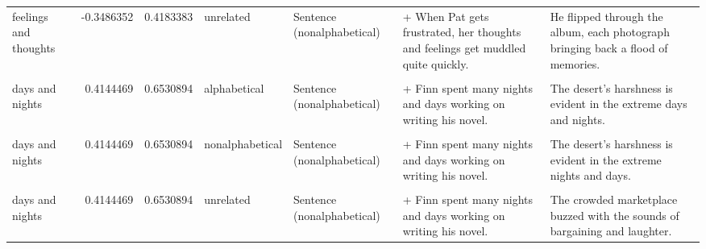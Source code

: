\documentclass[
  12pt,
]{scrartcl}
\begin{document}
\begin{landscape}
\begin{longtable}{lrrllll}
feelings and thoughts & -0.3486352 & 0.4183383 & unrelated & Sentence (nonalphabetical) & + When Pat gets frustrated, her thoughts and feelings get muddled quite quickly. & He flipped through the album, each photograph bringing back a flood of memories.\\
\cellcolor{gray!6}{days and nights} & \cellcolor{gray!6}{0.4144469} & \cellcolor{gray!6}{0.6530894} & \cellcolor{gray!6}{alphabetical} & \cellcolor{gray!6}{Sentence (alphabetical)} & \cellcolor{gray!6}{+ Finn spent many days and nights working on writing his novel.} & \cellcolor{gray!6}{The desert's harshness is evident in the extreme days and nights.}\\
\addlinespace
days and nights & 0.4144469 & 0.6530894 & alphabetical & Sentence (nonalphabetical) & + Finn spent many nights and days working on writing his novel. & The desert's harshness is evident in the extreme days and nights.\\
\cellcolor{gray!6}{days and nights} & \cellcolor{gray!6}{0.4144469} & \cellcolor{gray!6}{0.6530894} & \cellcolor{gray!6}{nonalphabetical} & \cellcolor{gray!6}{Sentence (alphabetical)} & \cellcolor{gray!6}{+ Finn spent many days and nights working on writing his novel.} & \cellcolor{gray!6}{The desert's harshness is evident in the extreme nights and days.}\\
days and nights & 0.4144469 & 0.6530894 & nonalphabetical & Sentence (nonalphabetical) & + Finn spent many nights and days working on writing his novel. & The desert's harshness is evident in the extreme nights and days.\\
\cellcolor{gray!6}{days and nights} & \cellcolor{gray!6}{0.4144469} & \cellcolor{gray!6}{0.6530894} & \cellcolor{gray!6}{unrelated} & \cellcolor{gray!6}{Sentence (alphabetical)} & \cellcolor{gray!6}{+ Finn spent many days and nights working on writing his novel.} & \cellcolor{gray!6}{The crowded marketplace buzzed with the sounds of bargaining and laughter.}\\
days and nights & 0.4144469 & 0.6530894 & unrelated & Sentence (nonalphabetical) & + Finn spent many nights and days working on writing his novel. & The crowded marketplace buzzed with the sounds of bargaining and laughter.\\
\bottomrule

\end{longtable}

\endgroup{}

\end{landscape}
\end{document}

